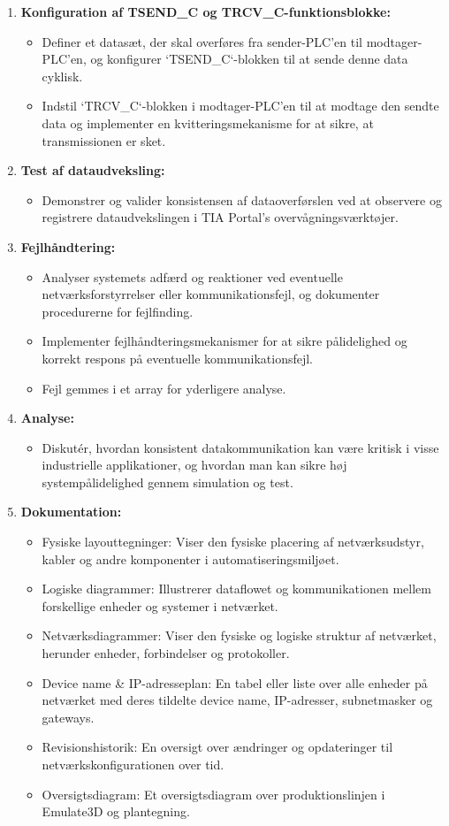 \begin{enumerate}
\begin{itemize}
	\end{itemize}
	\item \textbf{Konfiguration af TSEND\_C og TRCV\_C-funktionsblokke:}
	\begin{itemize}
		\item Definer et datasæt, der skal overføres fra sender-PLC'en til modtager-PLC'en, og konfigurer `TSEND\_C`-blokken til at sende denne data cyklisk.
		\item Indstil `TRCV\_C`-blokken i modtager-PLC'en til at modtage den sendte data og implementer en kvitteringsmekanisme for at sikre, at transmissionen er sket.
	\end{itemize}
	\item \textbf{Test af dataudveksling:}
	\begin{itemize}
		\item Demonstrer og valider konsistensen af dataoverførslen ved at observere og registrere dataudvekslingen i TIA Portal's overvågningsværktøjer.
	\end{itemize}
	\item \textbf{Fejlhåndtering:}
	\begin{itemize}
		\item Analyser systemets adfærd og reaktioner ved eventuelle netværksforstyrrelser eller kommunikationsfejl, og dokumenter procedurerne for fejlfinding.
		\item Implementer fejlhåndteringsmekanismer for at sikre pålidelighed og korrekt respons på eventuelle kommunikationsfejl.
		\item Fejl gemmes i et array for yderligere analyse.
	\end{itemize}
	\item \textbf{Analyse:}
	\begin{itemize}
		\item Diskutér, hvordan konsistent datakommunikation kan være kritisk i visse industrielle applikationer, og hvordan man kan sikre høj systempålidelighed gennem simulation og test.
	\end{itemize}
	\item \textbf{Dokumentation:}
	\begin{itemize}
		\item Fysiske layouttegninger: Viser den fysiske placering af netværksudstyr, kabler og andre komponenter i automatiseringsmiljøet.
		\item Logiske diagrammer: Illustrerer dataflowet og kommunikationen mellem forskellige enheder og systemer i netværket.
		\item Netværksdiagrammer: Viser den fysiske og logiske struktur af netværket, herunder enheder, forbindelser og protokoller.
		\item Device name \& IP-adresseplan: En tabel eller liste over alle enheder på netværket med deres tildelte device name, IP-adresser, subnetmasker og gateways.
		\item Revisionshistorik: En oversigt over ændringer og opdateringer til netværkskonfigurationen over tid.
		\item Oversigtsdiagram: Et oversigtsdiagram over produktionslinjen i Emulate3D og plantegning.
	\end{itemize}
\end{enumerate}

